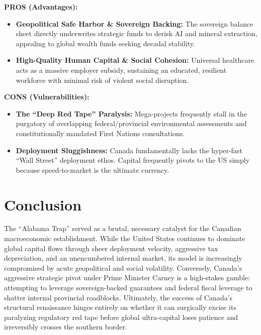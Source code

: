 \documentclass[11pt,a4paper]{article}
\begin{document}
\begin{tcbitemize}
    \tcbitem[title={The Canadian Model (Carney Era)\\[0.15cm]\normalsize\normalfont\textit{(Strategic Fortress \& Long-Term Base)}}]
    \textbf{PROS (Advantages):}
    \begin{itemize}[leftmargin=1.2em, itemsep=0.3em]
        \item \textbf{Geopolitical Safe Harbor \& Sovereign Backing:} The sovereign balance sheet directly underwrites strategic funds to derisk AI and mineral extraction, appealing to global wealth funds seeking decadal stability.
        \item \textbf{High-Quality Human Capital \& Social Cohesion:} Universal healthcare acts as a massive employer subsidy, sustaining an educated, resilient workforce with minimal risk of violent social disruption.
    \end{itemize}
    \vspace{0.2cm}
    \textbf{CONS (Vulnerabilities):}
    \begin{itemize}[leftmargin=1.2em, itemsep=0.3em]
        \item \textbf{The ``Deep Red Tape'' Paralysis:} Mega-projects frequently stall in the purgatory of overlapping federal/provincial environmental assessments and constitutionally mandated First Nations consultations.
        \item \textbf{Deployment Sluggishness:} Canada fundamentally lacks the hyper-fast ``Wall Street'' deployment ethos. Capital frequently pivots to the US simply because speed-to-market is the ultimate currency.
    \end{itemize}
    
\end{tcbitemize}
\vspace{0.5cm}

\section{Conclusion}

The ``Alabama Trap'' served as a brutal, necessary catalyst for the Canadian macroeconomic establishment. While the United States continues to dominate global capital flows through sheer deployment velocity, aggressive tax depreciation, and an unencumbered internal market, its model is increasingly compromised by acute geopolitical and social volatility. Conversely, Canada’s aggressive strategic pivot under Prime Minister Carney is a high-stakes gamble: attempting to leverage sovereign-backed guarantees and federal fiscal leverage to shatter internal provincial roadblocks. Ultimately, the success of Canada’s structural renaissance hinges entirely on whether it can surgically excise its paralyzing regulatory red tape before global ultra-capital loses patience and irreversibly crosses the southern border.
\end{document}
